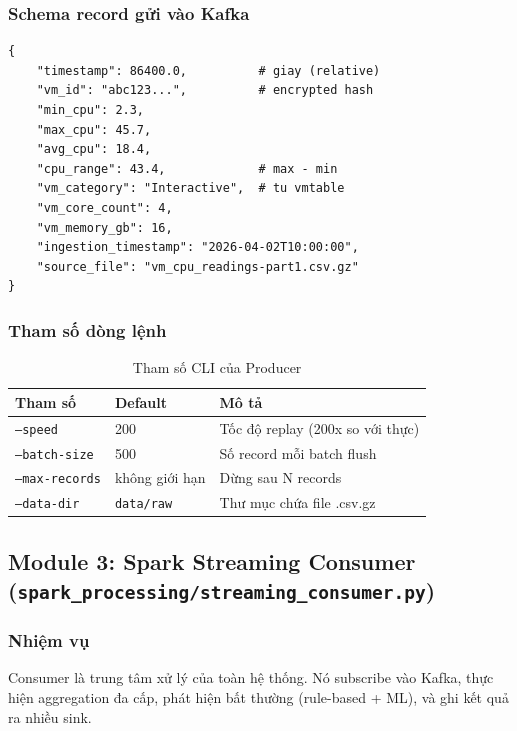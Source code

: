 \documentclass[12pt,a4paper]{article}
\begin{document}
\subsubsection{Schema record gửi vào Kafka}
\begin{lstlisting}[style=python, caption={JSON record được gửi vào topic vm-cpu-usage}]
{
    "timestamp": 86400.0,          # giay (relative)
    "vm_id": "abc123...",          # encrypted hash
    "min_cpu": 2.3,
    "max_cpu": 45.7,
    "avg_cpu": 18.4,
    "cpu_range": 43.4,             # max - min
    "vm_category": "Interactive",  # tu vmtable
    "vm_core_count": 4,
    "vm_memory_gb": 16,
    "ingestion_timestamp": "2026-04-02T10:00:00",
    "source_file": "vm_cpu_readings-part1.csv.gz"
}
\end{lstlisting}

\subsubsection{Tham số dòng lệnh}
\begin{table}[H]
\centering
\begin{tabularx}{\linewidth}{l l X}
\toprule
\textbf{Tham số} & \textbf{Default} & \textbf{Mô tả} \\
\midrule
\texttt{--speed} & 200 & Tốc độ replay (200x so với thực) \\
\texttt{--batch-size} & 500 & Số record mỗi batch flush \\
\texttt{--max-records} & không giới hạn & Dừng sau N records \\
\texttt{--data-dir} & \texttt{data/raw} & Thư mục chứa file .csv.gz \\
\bottomrule
\end{tabularx}
\caption{Tham số CLI của Producer}
\end{table}

\subsection{Module 3: Spark Streaming Consumer (\texttt{spark\_processing/streaming\_consumer.py})}

\subsubsection{Nhiệm vụ}
Consumer là trung tâm xử lý của toàn hệ thống. Nó subscribe vào Kafka, thực hiện aggregation đa cấp, phát hiện bất thường (rule-based + ML), và ghi kết quả ra nhiều sink.
\end{document}
